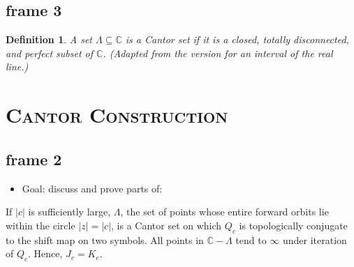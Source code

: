 \documentclass[xcolor=x11names,compress]{beamer}
\renewcommand{\(}{\begin{columns}}
\renewcommand{\)}{\end{columns}}
\newcommand{\<}[1]{\begin{column}{#1}}
\renewcommand{\>}{\end{column}}
\newtheorem{defn}{Definition}
\begin{document}

\subsection{frame 3}
\begin{frame}

\begin{defn}
A set $\Lambda \subseteq \mathbb{C}$ is a Cantor set if it is a closed, totally disconnected, and perfect subset of $\mathbb{C}$. (Adapted from the version for an interval of the real line.)
\end{defn}

\end{frame}




\section{\scshape Cantor Construction}


\subsection{frame 2}
\begin{frame}

\begin{itemize}
\item Goal: discuss and prove parts of:
\end{itemize}

\vspace{1cm}

\begin{theorem}
If $|c|$ is sufficiently large, $\Lambda$, the set of points whose entire forward orbits lie within the circle $|z|=|c|$, is a Cantor set on which $Q_c$ is topologically conjugate to the shift map on two symbols. All points in $\mathbb{C} - \Lambda$ tend to $\infty$ under iteration of $Q_c$. Hence, $J_c=K_c$.
\end{theorem}

\end{frame}
\end{document}

